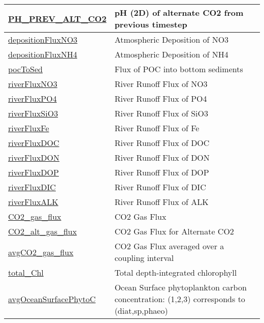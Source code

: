 {\begin{center}
\begin{longtable}{| p{2.0in} | p{4.0in} |}
    \hline
    \hyperref[subsec:var_sec_forcing_PH_PREV_ALT_CO2]{PH\_PREV\_ALT\_CO2} & pH (2D) of alternate CO2 from previous timestep \\
    \hline
    \hyperref[subsec:var_sec_forcing_depositionFluxNO3]{depositionFluxNO3} & Atmospheric Deposition of NO3 \\
    \hline
    \hyperref[subsec:var_sec_forcing_depositionFluxNH4]{depositionFluxNH4} & Atmospheric Deposition of NH4 \\
    \hline
    \hyperref[subsec:var_sec_forcing_pocToSed]{pocToSed} & Flux of POC into bottom sediments \\
    \hline
    \hyperref[subsec:var_sec_forcing_riverFluxNO3]{riverFluxNO3} & River Runoff Flux of NO3 \\
    \hline
    \hyperref[subsec:var_sec_forcing_riverFluxPO4]{riverFluxPO4} & River Runoff Flux of PO4 \\
    \hline
    \hyperref[subsec:var_sec_forcing_riverFluxSiO3]{riverFluxSiO3} & River Runoff Flux of SiO3 \\
    \hline
    \hyperref[subsec:var_sec_forcing_riverFluxFe]{riverFluxFe} & River Runoff Flux of Fe \\
    \hline
    \hyperref[subsec:var_sec_forcing_riverFluxDOC]{riverFluxDOC} & River Runoff Flux of DOC \\
    \hline
    \hyperref[subsec:var_sec_forcing_riverFluxDON]{riverFluxDON} & River Runoff Flux of DON \\
    \hline
    \hyperref[subsec:var_sec_forcing_riverFluxDOP]{riverFluxDOP} & River Runoff Flux of DOP \\
    \hline
    \hyperref[subsec:var_sec_forcing_riverFluxDIC]{riverFluxDIC} & River Runoff Flux of DIC \\
    \hline
    \hyperref[subsec:var_sec_forcing_riverFluxALK]{riverFluxALK} & River Runoff Flux of ALK \\
    \hline
    \hyperref[subsec:var_sec_forcing_CO2_gas_flux]{CO2\_gas\_flux} & CO2 Gas Flux \\
    \hline
    \hyperref[subsec:var_sec_forcing_CO2_alt_gas_flux]{CO2\_alt\_gas\_flux} & CO2 Gas Flux for Alternate CO2 \\
    \hline
    \hyperref[subsec:var_sec_forcing_avgCO2_gas_flux]{avgCO2\_gas\_flux} & CO2 Gas Flux averaged over a coupling interval \\
    \hline
    \hyperref[subsec:var_sec_forcing_total_Chl]{total\_Chl} & Total depth-integrated chlorophyll \\
    \hline
    \hyperref[subsec:var_sec_forcing_avgOceanSurfacePhytoC]{avgOceanSurfacePhytoC} & Ocean Surface phytoplankton carbon concentration: (1,2,3) corresponds to (diat,sp,phaeo) \\

\end{longtable}
\end{center}}
